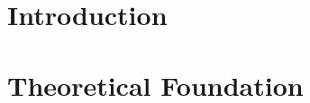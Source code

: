 \documentclass[12pt]{report}
\begin{document}

\tableofcontents

% 

\chapter{Introduction}






\chapter{Theoretical Foundation}\label{chap:2}









\printbibliography
\end{document}
